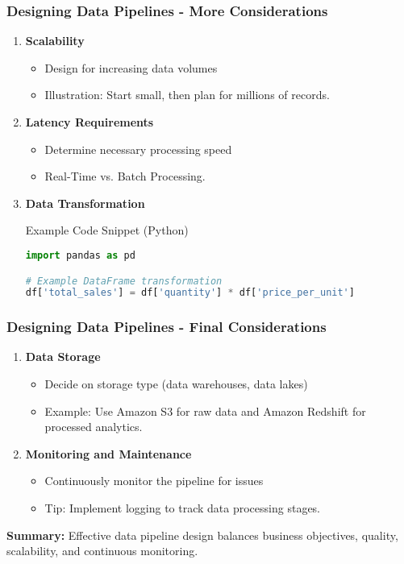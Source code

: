 \documentclass{beamer}
\begin{document}
\begin{frame}[fragile]
    \frametitle{Designing Data Pipelines - More Considerations}
    \begin{enumerate}[resume]
        \item \textbf{Scalability}
            \begin{itemize}
                \item Design for increasing data volumes
                \item Illustration: Start small, then plan for millions of records.
            \end{itemize}
        \item \textbf{Latency Requirements}
            \begin{itemize}
                \item Determine necessary processing speed
                \item Real-Time vs. Batch Processing.
            \end{itemize}
        \item \textbf{Data Transformation}
            \begin{block}{Example Code Snippet (Python)}
                \begin{lstlisting}[language=Python]
import pandas as pd

# Example DataFrame transformation
df['total_sales'] = df['quantity'] * df['price_per_unit']
                \end{lstlisting}
            \end{block}
    \end{enumerate}
\end{frame}

\begin{frame}[fragile]
    \frametitle{Designing Data Pipelines - Final Considerations}
    \begin{enumerate}[resume]
        \item \textbf{Data Storage}
            \begin{itemize}
                \item Decide on storage type (data warehouses, data lakes)
                \item Example: Use Amazon S3 for raw data and Amazon Redshift for processed analytics.
            \end{itemize}
        \item \textbf{Monitoring and Maintenance}
            \begin{itemize}
                \item Continuously monitor the pipeline for issues
                \item Tip: Implement logging to track data processing stages.
            \end{itemize}
    \end{enumerate}
    
    \textbf{Summary:} Effective data pipeline design balances business objectives, quality, scalability, and continuous monitoring.
\end{frame}
\end{document}
